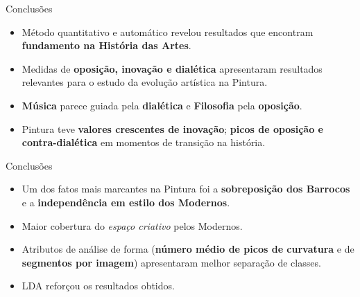 \documentclass{beamer}
\begin{document}
\begin{frame}{Conclusões}
\begin{itemize}
  \item<1> Método quantitativo e automático revelou resultados que encontram \textbf{fundamento na História das Artes}.

  \item<2> Medidas de \textbf{oposição, inovação e dialética} apresentaram resultados relevantes para o estudo da evolução artística na Pintura.

  \item<3> \textbf{Música} parece guiada pela \textbf{dialética} e \textbf{Filosofia} pela \textbf{oposição}.

  \item<4> Pintura teve \textbf{valores crescentes de inovação}; \textbf{picos de oposição e contra-dialética} em momentos de transição na história.
\end{itemize}

\end{frame}

\begin{frame}{Conclusões}
\begin{itemize}
  \item<1> Um dos fatos mais marcantes na Pintura foi a \textbf{sobreposição dos Barrocos} e a \textbf{independência em estilo dos Modernos}.

  \item<2> Maior cobertura do \textit{espaço criativo} pelos Modernos.

  \item<3> Atributos de análise de forma (\textbf{número médio de picos de curvatura} e de \textbf{segmentos por imagem}) apresentaram melhor separação de classes.

  \item<4> LDA reforçou os resultados obtidos.
\end{itemize}

\end{frame}
\end{document}
